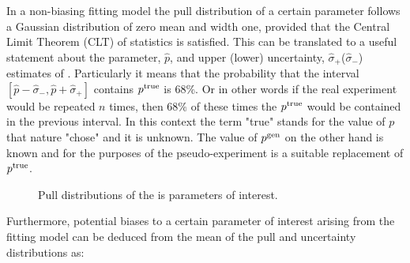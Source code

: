 In a non-biasing fitting model the pull distribution of a certain parameter follows a Gaussian distribution of zero mean and width
one, provided that the Central Limit Theorem (CLT) of statistics is satisfied.
This can be translated to a useful statement about the parameter, $\hat{p}$, and upper (lower) uncertainty, $\hat{\sigma}_+$($\hat{\sigma}_-$)
estimates of . Particularly it means that the probability that the interval
$[\hat{p}-\hat{\sigma}_-,\hat{p}+\hat{\sigma}_+]$ contains $p^{\rm true}$ is $68\%$. Or in other words if the
real experiment would be repeated $n$ times, then $68\%$ of these times the $p^{\rm true}$ would be contained
in the previous interval. In this context the term "true" stands for the value of $p$ that nature "chose"
and it is unknown. The value of $p^{\rm gen}$ on the other hand is known and for the purposes of the pseudo-experiment
is a suitable replacement of $p^{\rm true}$.

\begin{figure}[!t]
  \centering
  \begin{subfigure}{0.5\textwidth}
    \raggedright
    \scalebox{0.56}{}
    \caption{}
    \label{pull_ACP0}
  \end{subfigure}%
  \hfill%
  \begin{subfigure}{0.5\textwidth}
    \raggedleft
    \scalebox{0.56}{}
    \caption{}
    \label{pull_ACPperp}
  \end{subfigure}
  \begin{subfigure}{0.5\textwidth}
    \raggedright
    \scalebox{0.56}{}
    \caption{}
    \label{pull_ACPpar}
  \end{subfigure}%
  \hfill%
  \begin{subfigure}{0.5\textwidth}
    \raggedleft
    \scalebox{0.56}{}
    \caption{}
    \label{pull_ACPS}
  \end{subfigure}
\caption{Pull distributions of the \Acp{i} parameters of interest.}
\label{pull_acp}
\end{figure}

Furthermore, potential biases to a certain parameter of interest arising from the fitting model
can be deduced from the mean of the pull and uncertainty distributions as:

